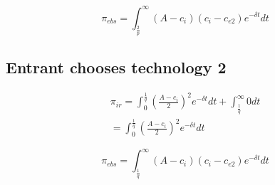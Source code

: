 \documentclass{article}
\begin{document}
\begin{equation*}
\pi_{ebs} = \int^{\infty}_{\frac{2}{p}} (A-c_i)(c_i-c_{e2})  e^{-\delta t}dt
\end{equation*}

\subsection*{Entrant chooses technology 2}

\begin{align*}
\pi_{ir} = \int^{\frac{1}{q}}_0 \left(\frac{A-c_i}{2} \right)^2 e^{-\delta t}dt 
+ \int^{\infty}_{\frac{1}{q}} 0 dt 
\\
=\int^{\frac{1}{q}}_0 \left(\frac{A-c_i}{2} \right)^2 e^{-\delta t}dt 
\end{align*}

\begin{equation*}
\pi_{ebs} = \int^{\infty}_{\frac{1}{q}} (A-c_i)(c_i-c_{e2})  e^{-\delta t}dt
\end{equation*}



\end{document}
